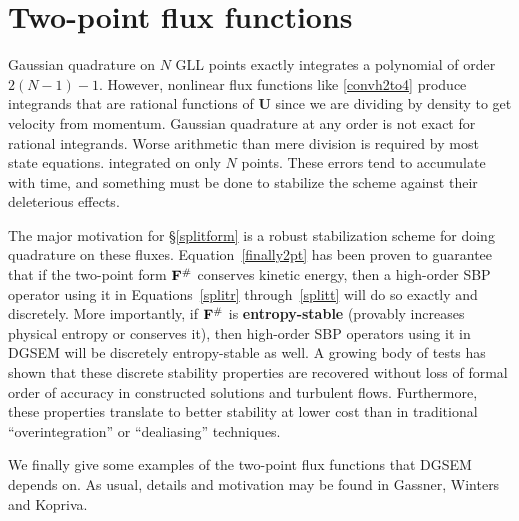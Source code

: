 \section{Two-point flux functions}
Gaussian quadrature on $N$ GLL points exactly integrates a polynomial of order
${2(\!N\!-\!1\!)-1}$. However, nonlinear flux functions like
\ref{convh2to4} produce integrands that are rational functions of $\mathbf{U}$
since we are dividing by density to get velocity from momentum. Gaussian
quadrature at any order is not exact for rational integrands. %
Worse arithmetic than mere division is required by most state equations. 
integrated on only $N$ points. These errors tend to accumulate with time,
and something must be done to stabilize the scheme against their deleterious
effects.

The major motivation for \S\ref{splitform} is a robust stabilization scheme
for doing quadrature on these fluxes. Equation~\ref{finally2pt} has been
proven to guarantee that if the two-point form ${\bf F}^{\#}$ conserves kinetic energy,
then a high-order SBP operator using it in Equations~\ref{splitr}
through~\ref{splitt} will do so exactly and discretely. %
More importantly, if ${\bf F}^{\#}$ is \textbf{entropy-stable} (provably increases
physical entropy or conserves it), then high-order SBP operators using it in
DGSEM will be discretely entropy-stable as well. A growing body of tests
\cite{WALCHCOMPARISONTODEAL} has shown that these discrete stability properties
are recovered without loss of formal order of accuracy in constructed solutions
and turbulent flows. Furthermore, these properties translate to better stability
at lower cost than in traditional
``overintegration\cite{KirbyKard}'' or ``dealiasing'' techniques.

We finally give some examples of the two-point flux functions that DGSEM depends on.
As usual, details and motivation may be found in Gassner, Winters and Kopriva\cite{}.
